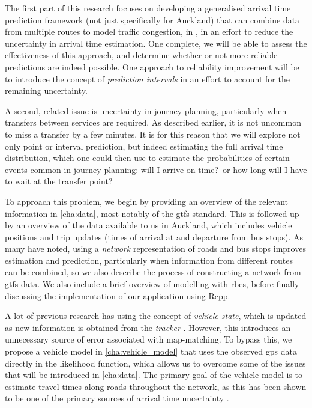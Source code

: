 The first part of this research focuses on developing a generalised arrival time prediction framework (not just specifically for Auckland) that can combine data from multiple routes to model traffic congestion, in \rt{}, in an effort to reduce the uncertainty in arrival time estimation. One complete, we will be able to assess the effectiveness of this approach, and determine whether or not more reliable predictions are indeed possible. One approach to reliability improvement will be to introduce the concept of \emph{prediction intervals} in an effort to account for the remaining uncertainty.


A second, related issue is uncertainty in journey planning, particularly when transfers between services are required. As described earlier, it is not uncommon to miss a transfer by a few minutes. It is for this reason that we will explore not only point or interval prediction, but indeed estimating the full arrival time distribution, which one could then use to estimate the probabilities of certain events common in journey planning: will I arrive on time?\ or how long will I have to wait at the transfer point?



To approach this problem, we begin by providing an overview of the relevant information in \cref{cha:data}, most notably of the \gls{gtfs} standard. This is followed up by an overview of the data available to us in Auckland, which includes vehicle positions and trip updates (times of arrival at and departure from bus stops). As many have noted, using a \emph{network} representation of roads and bus stops improves estimation and prediction, particularly when information from different routes can be combined, so we also describe the process of constructing a network from \gls{gtfs} data. We also include a brief overview of \rt{} modelling with \glspl{rbe}, before finally discussing the \rt{} implementation of our application using \textsf{Rcpp}.


A lot of previous research has using the concept of \emph{vehicle state}, which is updated as new information is obtained from the \emph{tracker} \citep{Cathey_2003}. However, this introduces an unnecessary source of error associated with map-matching. To bypass this, we propose a \rt{} vehicle model in \cref{cha:vehicle_model} that uses the observed \gls{gps} data directly in the likelihood function, which allows us to overcome some of the issues that will be introduced in \cref{cha:data}. The primary goal of the vehicle model is to estimate travel times along roads throughout the network, as this has been shown to be one of the primary sources of arrival time uncertainty \citep{cn}.


